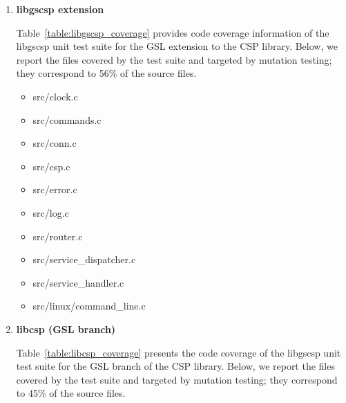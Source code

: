\begin{enumerate}
	\item \textbf{libgscsp extension}

	Table~\ref{table:libgscsp_coverage} provides code coverage information of the libgscsp unit test suite for the GSL extension to the CSP library. Below, we report the files covered by the test suite and targeted by mutation testing; they correspond to 56\% of the source files. %
	
	\begin{itemize}
	 	\item src/clock.c
	 	\item src/commands.c
	 	\item src/conn.c
	 	\item src/csp.c
	 	\item src/error.c
	 	\item src/log.c
	 	\item src/router.c
	 	\item src/service\_dispatcher.c
	 	\item src/service\_handler.c
	 	\item src/linux/command\_line.c

	 \end{itemize} 

	\item \textbf{libcsp (GSL branch)}

	Table~\ref{table:libcsp_coverage} presents the code coverage of the libgscsp unit test suite for the GSL branch of the CSP library. 
Below, we report the files covered by the test suite and targeted by mutation testing; they correspond to 45\% of the source files. %


\end{enumerate}
